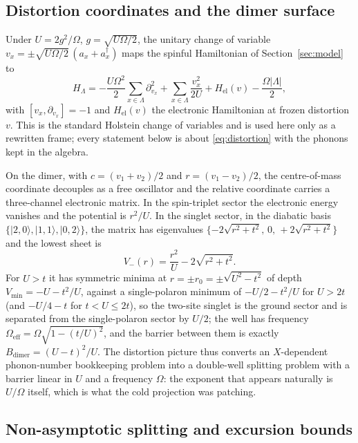 \documentclass[11pt]{article}
\theoremstyle{definition}
\theoremstyle{remark}
\begin{document}
\subsection{Distortion coordinates and the dimer surface}

Under $U=2g^{2}/\Omega$, $g=\sqrt{U\Omega/2}$, the unitary change of variable
$v_{x}=\pm\sqrt{U\Omega/2}\,(a_{x}+a_{x}^{\dagger})$ maps the spinful Hamiltonian
of Section~\ref{sec:model} to
\begin{equation}
H_{\Lambda}
=-\frac{U\Omega^{2}}{2}\sum_{x\in\Lambda}\partial_{v_{x}}^{2}
+\sum_{x\in\Lambda}\frac{v_{x}^{2}}{2U}+H_{\mathrm{el}}(v)
-\frac{\Omega|\Lambda|}{2},
\label{eq:distortion}
\end{equation}
with $[v_{x},\partial_{v_{x}}]=-1$ and $H_{\mathrm{el}}(v)$ the electronic
Hamiltonian at frozen distortion $v$. This is the standard Holstein change of
variables \cite{holstein1959,langfirsov} and is used here only as a rewritten
frame; every statement below is about \eqref{eq:distortion} with the phonons kept
in the algebra.

On the dimer, with $c=(v_{1}+v_{2})/2$ and $r=(v_{1}-v_{2})/2$, the
centre-of-mass coordinate decouples as a free oscillator and the relative
coordinate carries a three-channel electronic matrix. In the spin-triplet sector
the electronic energy vanishes and the potential is $r^{2}/U$. In the singlet
sector, in the diabatic basis $\{|2,0\rangle,|1,1\rangle,|0,2\rangle\}$, the
matrix has eigenvalues $\{-2\sqrt{r^{2}+t^{2}},\,0,\,+2\sqrt{r^{2}+t^{2}}\}$ and
the lowest sheet is
\begin{equation}
V_{-}(r)=\frac{r^{2}}{U}-2\sqrt{r^{2}+t^{2}} .
\label{eq:vminus}
\end{equation}
For $U>t$ it has symmetric minima at $r=\pm r_{0}=\pm\sqrt{U^{2}-t^{2}}$ of depth
$V_{\min}=-U-t^{2}/U$, against a single-polaron minimum of $-U/2-t^{2}/U$ for
$U>2t$ (and $-U/4-t$ for $t<U\le2t$), so the two-site singlet is the ground
sector and is separated from the single-polaron sector by $U/2$; the well has
frequency
$\Omega_{\mathrm{eff}}=\Omega\sqrt{1-(t/U)^{2}}$, and the barrier between them is
exactly $B_{\mathrm{dimer}}=(U-t)^{2}/U$. The distortion picture thus converts an
$X$-dependent phonon-number bookkeeping problem into a double-well splitting
problem with a barrier linear in $U$ and a frequency $\Omega$: the exponent that
appears naturally is $U/\Omega$ itself, which is what the cold projection was
patching.

\subsection{Non-asymptotic splitting and excursion bounds}
\end{document}
